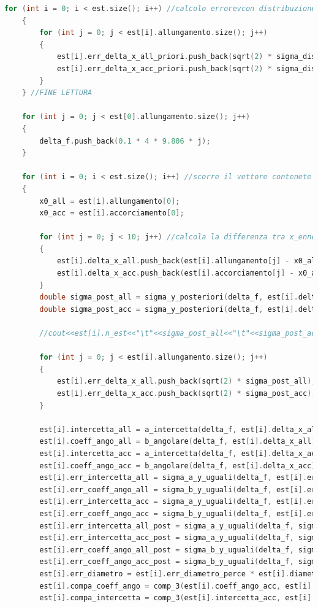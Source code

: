 \documentclass[a4paper,11pt,oneside]{article}
\begin{document}
\begin{lstlisting}[language=C++, label=lst:seconda_parte, caption=seconda\_parte]
	for (int i = 0; i < est.size(); i++) //calcolo errorevcon distribuzione uniforme solo per fare grafici, commenta questo e decommenta sotto per avere la sigma post
	{
		for (int j = 0; j < est[i].allungamento.size(); j++)
		{
			est[i].err_delta_x_all_priori.push_back(sqrt(2) * sigma_dist_uni(5.0, 1));
			est[i].err_delta_x_acc_priori.push_back(sqrt(2) * sigma_dist_uni(5.0, 1));
		}
	} //FINE LETTURA

	for (int j = 0; j < est[0].allungamento.size(); j++)
	{
		delta_f.push_back(0.1 * 4 * 9.806 * j);
	}

	for (int i = 0; i < est.size(); i++) //scorre il vettore contenete le strutture
	{
		x0_all = est[i].allungamento[0];
		x0_acc = est[i].accorciamento[0];

		for (int j = 0; j < 10; j++) //calcola la differenza tra x_ennesimo e x_0, per annullare err sistematico di posizionamento zero
		{
			est[i].delta_x_all.push_back(est[i].allungamento[j] - x0_all);
			est[i].delta_x_acc.push_back(est[i].accorciamento[j] - x0_acc);
		}
		double sigma_post_all = sigma_y_posteriori(delta_f, est[i].delta_x_all);
		double sigma_post_acc = sigma_y_posteriori(delta_f, est[i].delta_x_acc);

		//cout<<est[i].n_est<<"\t"<<sigma_post_all<<"\t"<<sigma_post_acc<<"\t"<<sqrt(2) * sigma_dist_uni(5.0, 1)<<"\t"<<sqrt(2) * sigma_dist_uni(10.0, 1)<<endl;

		for (int j = 0; j < est[i].allungamento.size(); j++)
		{
			est[i].err_delta_x_all.push_back(sqrt(2) * sigma_post_all); //DECOMMENTA SE VUOI AVERE SIGMA A POSTERIORI
			est[i].err_delta_x_acc.push_back(sqrt(2) * sigma_post_acc);
		}

		est[i].intercetta_all = a_intercetta(delta_f, est[i].delta_x_all);				  //non metto err perchè tutti uguali
		est[i].coeff_ango_all = b_angolare(delta_f, est[i].delta_x_all);				  //
		est[i].intercetta_acc = a_intercetta(delta_f, est[i].delta_x_acc);				  //non metto err perchè tutti uguali
		est[i].coeff_ango_acc = b_angolare(delta_f, est[i].delta_x_acc);				  //
		est[i].err_intercetta_all = sigma_a_y_uguali(delta_f, est[i].err_delta_x_all[0]); //DA RIMUOVERE SE LA SADA DICE CHE TENIAMO SIGMA POST
		est[i].err_coeff_ango_all = sigma_b_y_uguali(delta_f, est[i].err_delta_x_all[0]); //
		est[i].err_intercetta_acc = sigma_a_y_uguali(delta_f, est[i].err_delta_x_acc[0]); //attenzione al double
		est[i].err_coeff_ango_acc = sigma_b_y_uguali(delta_f, est[i].err_delta_x_acc[0]); //
		est[i].err_intercetta_all_post = sigma_a_y_uguali(delta_f, sigma_post_all);		  //Sigma di a e b in all e acc con la sigma post
		est[i].err_intercetta_acc_post = sigma_a_y_uguali(delta_f, sigma_post_acc);
		est[i].err_coeff_ango_all_post = sigma_b_y_uguali(delta_f, sigma_post_all);
		est[i].err_coeff_ango_acc_post = sigma_b_y_uguali(delta_f, sigma_post_acc);
		est[i].err_diametro = est[i].err_diametro_perce * est[i].diametro;
		est[i].compa_coeff_ango = comp_3(est[i].coeff_ango_acc, est[i].coeff_ango_all, est[i].err_coeff_ango_acc_post, est[i].err_coeff_ango_all_post); //
		est[i].compa_intercetta = comp_3(est[i].intercetta_acc, est[i].intercetta_all, est[i].err_intercetta_acc_post, est[i].err_intercetta_all_post);


\end{lstlisting}
\end{document}
